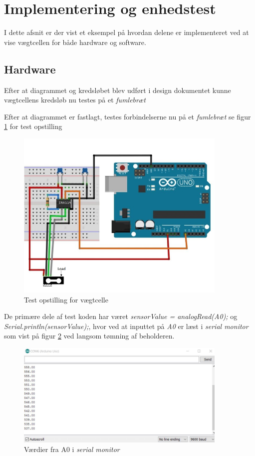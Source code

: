 \section{Implementering og enhedstest}
\label{subsec:Implement}
I dette afsnit er der vist et eksempel på hvordan delene er implementeret ved at vise vægtcellen for både hardware og software.

\subsection{Hardware}
Efter at diagrammet og kredsløbet blev udført i design dokumentet kunne vægtcellens kredsløb nu testes på et \textit{fumlebræt} 

Efter at diagrammet er fastlagt, testes forbindelserne nu på et \textit{fumlebræt} se figur \ref{fig:loadcelltest} for test opstilling

  \begin{figure}[H]
	\centering
	\includegraphics[width=0.9\textwidth]{billeder/Hardware/diagrammer/Drawing1.jpg}
	\caption{Test opstilling for vægtcelle}
	\label{fig:loadcelltest}
\end{figure}
De primære dele af test koden har været  \textit{sensorValue = analogRead(A0);} og \textit{Serial.println(sensorValue);}, hvor ved at inputtet på \textit{A0} er læst i \textit{serial monitor} som vist på figur \ref{fig:loadcell_test} ved langsom tømning af beholderen.

\begin{figure}[H]
	\centering
	\includegraphics[width=0.9\textwidth]{billeder/Hardware/diagrammer/loadcellunittestbits.JPG}
	\caption{Værdier fra A0 i \textit{serial monitor}}
	\label{fig:loadcell_test}
\end{figure}

